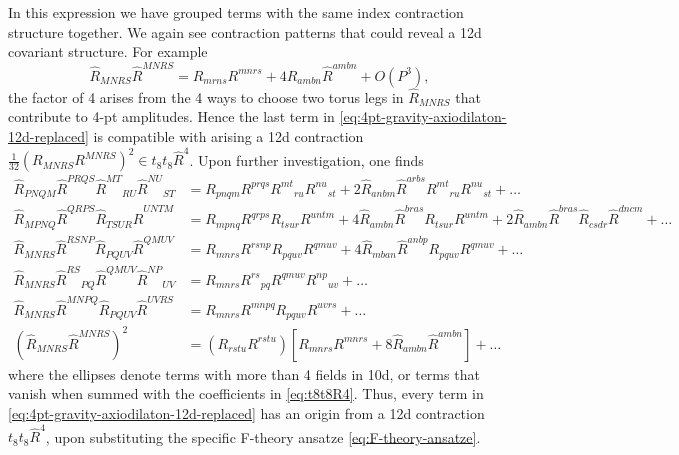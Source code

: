In this expression we have grouped terms with the same index contraction structure together. 
We again see contraction patterns that could reveal a 12d covariant structure.
For example
\begin{equation}
\widehat{R}_{MNRS}\widehat{R}^{MNRS} = R_{mrns} R^{mnrs} + 4 \widehat{R}_{ambn} \widehat{R}^{ambn} + O(P^3),
\end{equation}
the factor of 4 arises from the 4 ways to choose two torus legs in $\widehat{R}_{MNRS}$ that contribute to 4-pt amplitudes.
Hence the last term in \eqref{eq:4pt-gravity-axiodilaton-12d-replaced} is compatible with arising a 12d contraction $\frac{1}{32} (R_{MNRS} R^{MNRS})^2  \in t_8 t_8 \widehat{R}^4$.
Upon further investigation, one finds
\begin{equation}
\begin{aligned}
\widehat{R}_{PNQM} \widehat{R}^{PRQS} \widehat{R}^{MT}{}_{RU} \widehat{R}^{NU}{}_{ST}
&=
R_{pnqm} R^{prqs} R^{mt}{}_{ru} R^{nu}{}_{st}
+ 2 \widehat{R}_{anbm} \widehat{R}^{arbs} R^{mt}{}_{ru} R^{nu}{}_{st}+ \ldots\\
\widehat{R}_{MPNQ} \widehat{R}^{QRPS} \widehat{R}_{TSUR} \widehat{R}^{UNTM}
&= R_{mpnq} R^{qrps} R_{tsur} R^{untm}
+ 4 \widehat{R}_{ambn} \widehat{R}^{bras} R_{tsur} R^{untm}
+ 2 \widehat{R}_{ambn} \widehat{R}^{bras} \widehat{R}_{csdr} \widehat{R}^{dncm}+ \ldots\\
\widehat{R}_{MNRS} \widehat{R}^{RSNP} \widehat{R}_{PQUV} \widehat{R}^{QMUV}
&= R_{mnrs} R^{rsnp} R_{pquv} R^{qmuv}
 + 4 \widehat{R}_{mban} \widehat{R}^{anbp} R_{pquv} R^{qmuv}+ \ldots\\
\widehat{R}_{MNRS} \widehat{R}^{RS}{}_{PQ} \widehat{R}^{QMUV} \widehat{R}^{NP}{}_{UV}
&= R_{mnrs} R^{rs}{}_{pq} R^{qmuv} R^{np}{}_{uv}+ \ldots\\
\widehat{R}_{MNRS} \widehat{R}^{MNPQ} \widehat{R}_{PQUV} \widehat{R}^{UVRS}
&= R_{mnrs} R^{mnpq} R_{pquv} R^{uvrs}+ \ldots\\
(\widehat{R}_{MNRS}\widehat{R}^{MNRS})^2
&= (R_{rstu} R^{rstu})
\left[R_{mnrs} R^{mnrs}+ 8 \widehat{R}_{ambn} \widehat{R}^{ambn}\right]+ \ldots
\end{aligned}
\end{equation}
where the ellipses denote terms with more than 4 fields in 10d, or terms that vanish when summed with the coefficients in \eqref{eq:t8t8R4}.
Thus, every term in \eqref{eq:4pt-gravity-axiodilaton-12d-replaced} has an origin from a 12d contraction $t_8 t_8 \widehat{R}^4$, upon substituting the specific F-theory ansatze \eqref{eq:F-theory-ansatze}.

